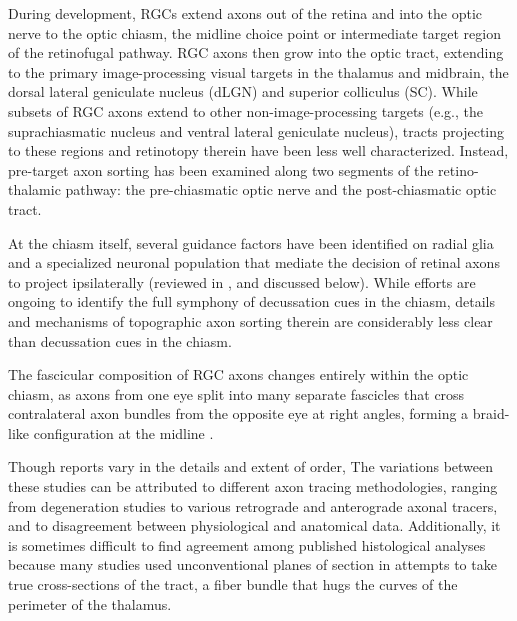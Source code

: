 \label{sec:RetinogeniculateOrganization}

During development, RGCs extend axons out of the retina and into the optic nerve to the optic chiasm, the midline choice point or intermediate target region of the retinofugal pathway.
RGC axons then grow into the optic tract, extending to the primary image-processing visual targets in the thalamus and midbrain, the dorsal lateral geniculate nucleus (dLGN) and superior colliculus (SC).
While subsets of RGC axons extend to other non-image-processing targets (e.g., the suprachiasmatic nucleus and ventral lateral geniculate nucleus), tracts projecting to these regions and retinotopy therein have been less well characterized.
Instead, pre-target axon sorting has been examined along two segments of the retino-thalamic pathway: the pre-chiasmatic optic nerve and the post-chiasmatic optic tract.

At the chiasm itself, several guidance factors have been identified on radial glia and a specialized neuronal population that mediate the decision of retinal axons to project ipsilaterally (reviewed in \cite{petros2008retinal}, and discussed below).
While efforts are ongoing to identify the full symphony of decussation cues in the chiasm, details and mechanisms of topographic axon sorting therein are considerably less clear than decussation cues in the chiasm.

The fascicular composition of RGC axons changes entirely within the optic chiasm, as axons from one eye split into many separate fascicles that cross contralateral axon bundles from the opposite eye at right angles, forming a braid-like configuration at the midline \cite{colello1998changing}.


Though reports vary in the details and extent of order, %
The variations between these studies can be attributed to different axon tracing methodologies, ranging from degeneration studies to various retrograde and anterograde axonal tracers, and to disagreement between physiological and anatomical data.
Additionally, it is sometimes difficult to find agreement among published histological analyses because many studies used unconventional planes of section in attempts to take true cross-sections of the tract, a fiber bundle that hugs the curves of the perimeter of the thalamus.

